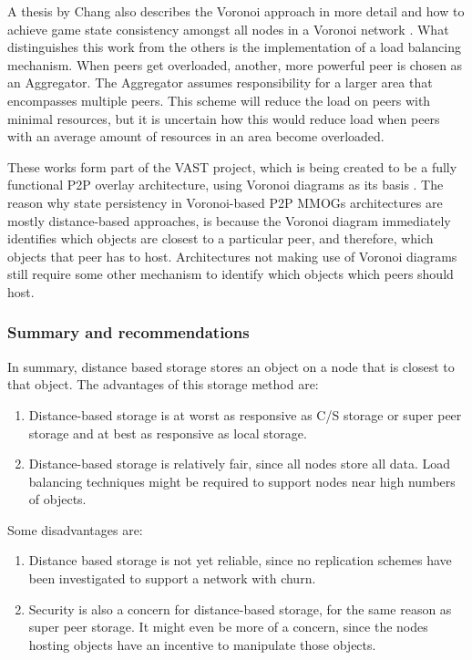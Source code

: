 \documentclass[10pt,a4paper,journal,cspaper,compsoc]{IEEEtran}
\begin{document}
A thesis by Chang also describes the Voronoi approach in more detail and how to achieve game state consistency amongst all nodes in a Voronoi network
\cite{Chang_Voronoi_state_management_masters}. What distinguishes this work from the others is the implementation of a load balancing mechanism. When
peers get overloaded, another, more powerful peer is chosen as an Aggregator. The Aggregator assumes responsibility for a larger area that
encompasses multiple peers. This scheme will reduce the load on peers with minimal resources, but it is uncertain how this would reduce load when
peers with an average amount of resources in an area become overloaded.

These works form part of the VAST project, which is being created to be a fully functional P2P overlay architecture, using Voronoi diagrams as its
basis \cite{VAST}. The reason why state persistency in Voronoi-based P2P MMOGs architectures are mostly distance-based approaches, is because the
Voronoi diagram immediately identifies which objects are closest to a particular peer, and therefore, which objects that peer has to host.
Architectures not making use of Voronoi diagrams still require some other mechanism to identify which objects which peers should host.

\subsubsection{Summary and recommendations}

In summary, distance based storage stores an object on a node that is closest to that object. The advantages of this storage method are:
%
\begin{enumerate}
    \item Distance-based storage is at worst as responsive as C/S storage or super peer storage and at best as responsive as local storage.
    \item Distance-based storage is relatively fair, since all nodes store all data. Load balancing techniques might be required to support nodes
        near high numbers of objects.
\end{enumerate}

Some disadvantages are:
%
\begin{enumerate}
    \item Distance based storage is not yet reliable, since no replication schemes have been investigated to support a network with churn.
    \item Security is also a concern for distance-based storage, for the same reason as super peer storage. It might even be more of a concern,
        since the nodes hosting objects have an incentive to manipulate those objects.
\end{enumerate}
\end{document}
